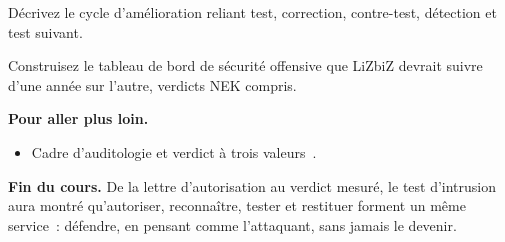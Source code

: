 \begin{boxexo}[title={\ding{45}\quad Exercice~26.9. Cycle \niveauexpert}]
Décrivez le cycle d'amélioration reliant test, correction, contre-test,
détection et test suivant.
\end{boxexo}

\begin{boxexo}[title={\ding{45}\quad Exercice~26.10. Tableau de bord \niveauexpert}]
Construisez le tableau de bord de sécurité offensive que LiZbiZ devrait
suivre d'une année sur l'autre, verdicts NEK compris.
\end{boxexo}

\bigskip

\begin{boxinfo}
\textbf{Pour aller plus loin.}
\begin{itemize}
    \item Cadre d'auditologie et verdict à trois valeurs~\cite{minka2026auditologie}.
\end{itemize}
\end{boxinfo}

\begin{boxinfo}
\textbf{Fin du cours.} De la lettre d'autorisation au verdict mesuré, le
test d'intrusion aura montré qu'autoriser, reconnaître, tester et restituer
forment un même service~: défendre, en pensant comme l'attaquant, sans
jamais le devenir.
\end{boxinfo}
